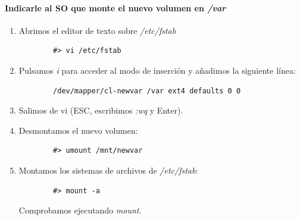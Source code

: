\documentclass[12pt,spanish]{article}
\begin{document}
\paragraph{Indicarle al SO que monte el nuevo volumen en \textit{/var}}
\begin{enumerate}
	\item Abrimos el editor de texto sobre \textit{/etc/fstab}
	\begin{lstlisting}
		#> vi /etc/fstab
	\end{lstlisting}
	\item Pulsamos \textit{i} para acceder al modo de inserción y añadimos la siguiente línea:
	\begin{lstlisting}
		/dev/mapper/cl-newvar /var ext4 defaults 0 0
	\end{lstlisting}
	\item Salimos de vi (ESC, escribimos \textit{:wq} y Enter).
	\item Desmontamos el nuevo volumen:
	\begin{lstlisting}
		#> umount /mnt/newvar
	\end{lstlisting}
	\item Montamos los sistemas de archivos de \textit{/etc/fstab}:
	\begin{lstlisting}
		#> mount -a
	\end{lstlisting}
	Comprobamos ejecutando \textit{mount}.
\end{enumerate}
\end{document}
